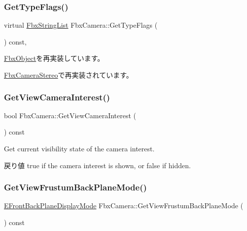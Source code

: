 \subsubsection{\texorpdfstring{Get\+Type\+Flags()}{GetTypeFlags()}}
{\footnotesize\ttfamily virtual \hyperlink{class_fbx_string_list}{Fbx\+String\+List} Fbx\+Camera\+::\+Get\+Type\+Flags (\begin{DoxyParamCaption}{ }\end{DoxyParamCaption}) const\hspace{0.3cm}{\ttfamily [protected]}, {\ttfamily [virtual]}}



\hyperlink{class_fbx_object_a6d30a5d00400039a248977cf9f9255b2}{Fbx\+Object}を再実装しています。



\hyperlink{class_fbx_camera_stereo_a73c9df71edcd9a56b2710357b95fcde6}{Fbx\+Camera\+Stereo}で再実装されています。

\mbox{\label{class_fbx_camera_a37fccd3efdcbde412e147c42bd08af0a}} 
\subsubsection{\texorpdfstring{Get\+View\+Camera\+Interest()}{GetViewCameraInterest()}}
{\footnotesize\ttfamily bool Fbx\+Camera\+::\+Get\+View\+Camera\+Interest (\begin{DoxyParamCaption}{ }\end{DoxyParamCaption}) const}

Get current visibility state of the camera interest. \begin{DoxyReturn}{戻り値}
{\ttfamily true} if the camera interest is shown, or {\ttfamily false} if hidden. 
\end{DoxyReturn}
\mbox{\label{class_fbx_camera_a8ff114b2298675c573b31428ede34871}} 
\subsubsection{\texorpdfstring{Get\+View\+Frustum\+Back\+Plane\+Mode()}{GetViewFrustumBackPlaneMode()}}
{\footnotesize\ttfamily \hyperlink{class_fbx_camera_ab7b9d3e546552049a79261a444f9b44a}{E\+Front\+Back\+Plane\+Display\+Mode} Fbx\+Camera\+::\+Get\+View\+Frustum\+Back\+Plane\+Mode (\begin{DoxyParamCaption}{ }\end{DoxyParamCaption}) const}

